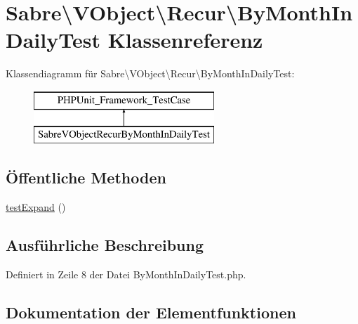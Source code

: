 \hypertarget{class_sabre_1_1_v_object_1_1_recur_1_1_by_month_in_daily_test}{}\section{Sabre\textbackslash{}V\+Object\textbackslash{}Recur\textbackslash{}By\+Month\+In\+Daily\+Test Klassenreferenz}
\label{class_sabre_1_1_v_object_1_1_recur_1_1_by_month_in_daily_test}
Klassendiagramm für Sabre\textbackslash{}V\+Object\textbackslash{}Recur\textbackslash{}By\+Month\+In\+Daily\+Test\+:\begin{figure}[H]
\begin{center}
\leavevmode
\includegraphics[height=2.000000cm]{class_sabre_1_1_v_object_1_1_recur_1_1_by_month_in_daily_test}
\end{center}
\end{figure}
\subsection*{Öffentliche Methoden}
\begin{DoxyCompactItemize}
\item 
\mbox{\hyperlink{class_sabre_1_1_v_object_1_1_recur_1_1_by_month_in_daily_test_a861fdfad961e765d6ef0e748f854ea81}{test\+Expand}} ()
\end{DoxyCompactItemize}


\subsection{Ausführliche Beschreibung}


Definiert in Zeile 8 der Datei By\+Month\+In\+Daily\+Test.\+php.



\subsection{Dokumentation der Elementfunktionen}
\mbox{\label{class_sabre_1_1_v_object_1_1_recur_1_1_by_month_in_daily_test_a861fdfad961e765d6ef0e748f854ea81}} 
